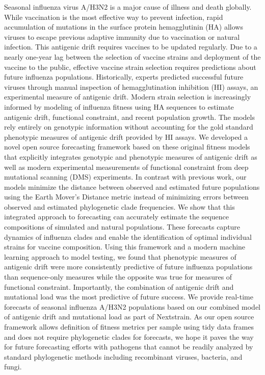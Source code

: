 Seasonal influenza virus A/H3N2 is a major cause of illness and death globally.
While vaccination is the most effective way to prevent infection, rapid accumulation of mutations in the surface protein hemagglutinin (HA) allows viruses to escape previous adaptive immunity due to vaccination or natural infection.
This antigenic drift requires vaccines to be updated regularly.
Due to a nearly one-year lag between the selection of vaccine strains and deployment of the vaccine to the public, effective vaccine strain selection requires predictions about future influenza populations.
Historically, experts predicted successful future viruses through manual inspection of hemagglutination inhibition (HI) assays, an experimental measure of antigenic drift.
Modern strain selection is increasingly informed by modeling of influenza fitness using HA sequences to estimate antigenic drift, functional constraint, and recent population growth.
The models rely entirely on genotypic information without accounting for the gold standard phenotypic measures of antigenic drift provided by HI assays.
We developed a novel open source forecasting framework based on these original fitness models that explicitly integrates genotypic and phenotypic measures of antigenic drift as well as modern experimental measurements of functional constraint from deep mutational scanning (DMS) experiments.
In contrast with previous work, our models minimize the distance between observed and estimated future populations using the Earth Mover's Distance metric instead of minimizing errors between observed and estimated phylogenetic clade frequencies.
We show that this integrated approach to forecasting can accurately estimate the sequence compositions of simulated and natural populations.
These forecasts capture dynamics of influenza clades and enable the identification of optimal individual strains for vaccine composition.
Using this framework and a modern machine learning approach to model testing, we found that phenotypic measures of antigenic drift were more consistently predictive of future influenza populations than sequence-only measures while the opposite was true for measures of functional constraint.
Importantly, the combination of antigenic drift and mutational load was the most predictive of future success.
We provide real-time forecasts of seasonal influenza A/H3N2 populations based on our combined model of antigenic drift and mutational load as part of Nextstrain.
As our open source framework allows definition of fitness metrics per sample using tidy data frames and does not require phylogenetic clades for forecasts, we hope it paves the way for future forecasting efforts with pathogens that cannot be readily analyzed by standard phylogenetic methods including recombinant viruses, bacteria, and fungi.
